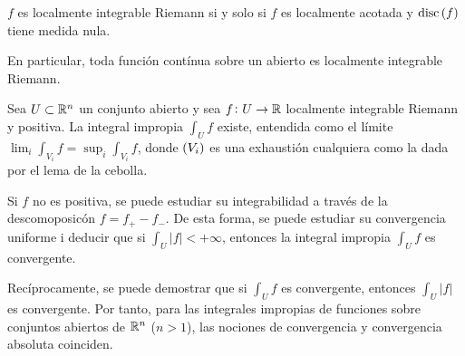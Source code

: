 \begin{prop}
    $f$ es localmente integrable Riemann si y solo si $f$ es localmente acotada y $\operatorname{disc} \left( f \right)$ tiene medida nula.
    
    En particular, toda función contínua sobre un abierto es localmente integrable Riemann.
\end{prop}

\begin{col}
    Sea $U\subset \mathbb{R}^n$ un conjunto abierto y sea $f\colon U \to \mathbb{R}$ localmente integrable Riemann y positiva. La integral impropia $\int_U f$ existe, entendida como el límite $\lim_i \int_{V_i} f = \sup_i \int_{V_i} f$, donde $\left( V_i \right)$ es una exhaustión cualquiera como la dada por el lema de la cebolla.
\end{col}

\begin{obs}
    Si $f$ no es positiva, se puede estudiar su integrabilidad a través de la descomoposicón $f=f_+ - f_-$. De esta forma, se puede estudiar su convergencia uniforme i deducir que si $\int_U \left| f \right| < +\infty$, entonces la integral impropia $\int_U f$ es convergente.
\end{obs}


\begin{obs}
    Recíprocamente, se puede demostrar que si $\int_U f$ es convergente, entonces $\int_U \left| f \right|$ es convergente. Por tanto, para las integrales impropias de funciones sobre conjuntos abiertos de $\mathbb{R}^n$ ($n>1$), las nociones de convergencia y convergencia absoluta coinciden.
\end{obs}








